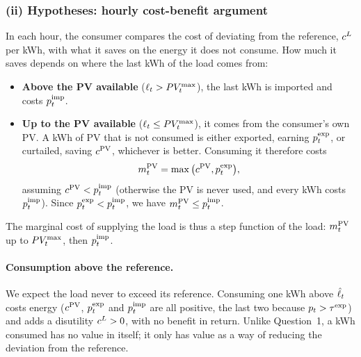 \subsubsection{(ii) Hypotheses: hourly cost-benefit argument}
In each hour, the consumer compares the cost of deviating from the reference, $c^{L}$ per kWh,
with what it saves on the energy it does not consume. How much it saves depends on where the
last kWh of the load comes from:
\begin{itemize}
    \item \textbf{Above the PV available} ($\ell_{t} > PV_{t}^{\max}$), the last kWh is imported and costs
    $p^{\mathrm{imp}}_{t}$.
    \item \textbf{Up to the PV available} ($\ell_{t} \leq PV_{t}^{\max}$), it comes from the consumer's own
    PV. A kWh of PV that is not consumed is either exported, earning $p^{\mathrm{exp}}_{t}$, or curtailed,
    saving $c^{\mathrm{PV}}$, whichever is better. Consuming it therefore costs
    \begin{equation}
        m^{\mathrm{PV}}_{t} = \max\big(c^{\mathrm{PV}}, p^{\mathrm{exp}}_{t}\big),
        \label{eq:q2b_mpv}
    \end{equation}
    assuming $c^{\mathrm{PV}} < p^{\mathrm{imp}}_{t}$ (otherwise the PV is never used, and every kWh costs $p^{\mathrm{imp}}_{t}$). Since
    $p^{\mathrm{exp}}_{t} < p^{\mathrm{imp}}_{t}$, we have $m^{\mathrm{PV}}_{t} \leq p^{\mathrm{imp}}_{t}$.
\end{itemize}
The marginal cost of supplying the load is thus a step function of the load: $m^{\mathrm{PV}}_{t}$ up to
$PV_{t}^{\max}$, then $p^{\mathrm{imp}}_{t}$.

\paragraph{Consumption above the reference.}
We expect the load never to exceed its reference. Consuming one kWh above $\hat{\ell}_{t}$ costs energy
($c^{\mathrm{PV}}$, $p^{\mathrm{exp}}_{t}$ and $p^{\mathrm{imp}}_{t}$ are all positive, the last two because $p_t > \tau^{\mathrm{exp}}$) and adds a
disutility $c^{L} > 0$, with no benefit in return. Unlike Question~1, a kWh consumed has no value
in itself; it only has value as a way of reducing the deviation from the reference.

